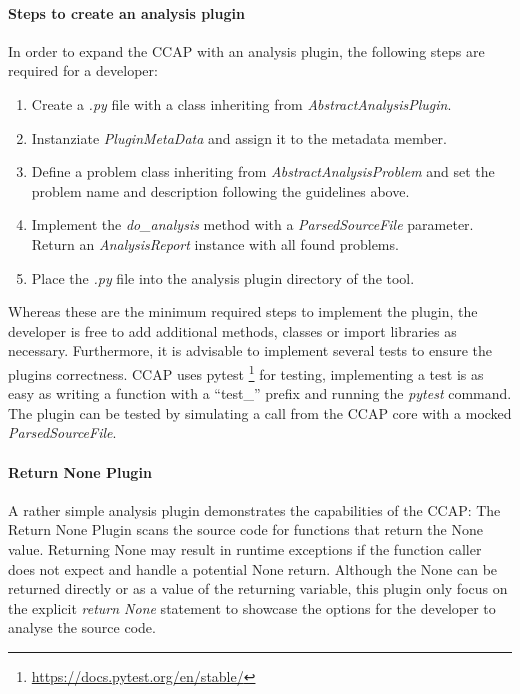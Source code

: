 \paragraph{Steps to create an analysis plugin}
In order to expand the CCAP with an analysis plugin, the following steps are required for a developer:
\begin{enumerate}
    \item Create a \textit{.py} file with a class inheriting from \textit{AbstractAnalysisPlugin}.
    \item Instanziate \textit{PluginMetaData} and assign it to the metadata member.
    \item Define a problem class inheriting from \textit{AbstractAnalysisProblem} and set the problem name and description following the guidelines above.
    \item Implement the \textit{do\_analysis} method with a \textit{ParsedSourceFile} parameter. Return an \textit{AnalysisReport} instance with all found problems.
    \item Place the \textit{.py} file into the analysis plugin directory of the tool.
\end{enumerate}
Whereas these are the minimum required steps to implement the plugin, the developer is free to add additional methods, classes or import libraries as necessary.
Furthermore, it is advisable to implement several tests to ensure the plugins correctness. CCAP uses pytest \footnote{\url{https://docs.pytest.org/en/stable/}} for testing, implementing a test is as easy as writing a function with a \enquote{test\_} prefix and running the \textit{pytest} command. The plugin can be tested by simulating a call from the CCAP core with a mocked \textit{ParsedSourceFile}. 

\paragraph{Return None Plugin}
A rather simple analysis plugin demonstrates the capabilities of the CCAP: The Return None Plugin scans the source code for functions that return the None value. Returning None may result in runtime exceptions if the function caller does not expect and handle a potential None return. Although the None can be returned directly or as a value of the returning variable, this plugin only focus on the explicit \textit{return None} statement to showcase the options for the developer to analyse the source code.


